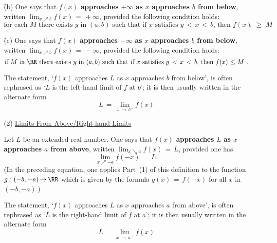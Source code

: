 {        \h (b) One says that {\bf $f(x)$ approaches $+{\infty}$ as $x$ approaches $b$ from below}, written ${\displaystyle \lim_{x{\nearrow}b} f(x) \,=\, +{\infty}}$,
    provided the following condition holds:
        \begin{equation}
        \label{CondC.130}
        \mbox{for each $M$ there exists $y$ in $(a,b)$ such that if $x$ satisfies $y\,<\,x\,<\,b$, then $f(x)\,\,{\geq}\,\,M$
}.
        \end{equation}

        \h (c) One says that {\bf $f(x)$ approaches $-{\infty}$ as $x$ approaches $b$ from below}, written ${\displaystyle \lim_{x{\nearrow}b} f(x) \,=\, -{\infty}}$,
    provided the following condition holds:
        \begin{equation}
        \label{CondC.140}
        \mbox{if $M$ in ${\RR}$ there exists $y$ in $(a,b)$ such that if $x$ satisfies $y\,<\,x\,<\,b$, then $f(x)\,\,{\leq}\,\,M$
}.
        \end{equation}

        The statement, `$f(x)$ approaches $L$ as $x$ approaches $b$ from below', is often rephrased as `$L$ is the left-hand limit of $f$ at $b$';
    it is then usually written in the alternate form
        \begin{displaymath}
        L \,=\, \lim_{x \,{\rightarrow}\, b^{-}} f(x)
        \end{displaymath}

\V

        (2) \underline{Limits From Above/Right-hand Limits}       

        Let $L$ be an extended real number. One says that {\bf $f(x)$ approaches $L$ as $x$ approaches $a$ from above},
    written $\lim_{x{\searrow}a} f(x) \,=\, L$, provided one has
        \begin{equation}
        \label{EqnC.150}
        \lim_{x{\nearrow}-a} f(-x) \,=\, L.
        \end{equation}
    (In the preceding equation, one applies Part~(1) of this definition to the function $g:(-b,-a) \,{\rightarrow}\, {\RR}$ which is given by the formula $g(x) \,=\, f(-x)$ for all $x$ in $(-b,-a)$.)

        The statement, `$f(x)$ approaches $L$ as $x$ approaches $a$ from above', is often rephrased as `$L$ is the right-hand limit of $f$ at $a$';
    it is then usually written in the alternate form
        \begin{displaymath}
        L \,=\, \lim_{x \,{\rightarrow}\, a^{+}} f(x)
        \end{displaymath}

}
